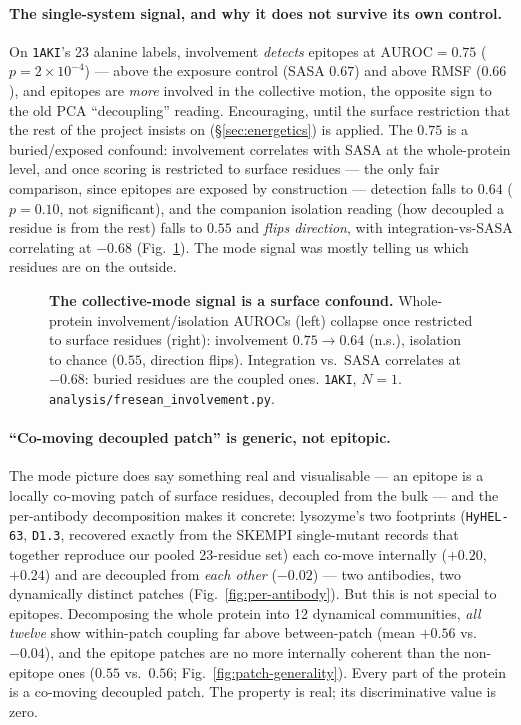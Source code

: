 \paragraph{The single-system signal, and why it does not survive its own control.} On \texttt{1AKI}'s
23 alanine labels, involvement \emph{detects} epitopes at $\mathrm{AUROC}=0.75$ ($p=2\times10^{-4}$) ---
above the exposure control (SASA $0.67$) and above RMSF ($0.66$), and epitopes are \emph{more} involved in
the collective motion, the opposite sign to the old PCA ``decoupling'' reading. Encouraging, until the
surface restriction that the rest of the project insists on (\S\ref{sec:energetics}) is applied. The
$0.75$ is a buried/exposed confound: involvement correlates with SASA at the whole-protein level, and once
scoring is restricted to surface residues --- the only fair comparison, since epitopes are exposed by
construction --- detection falls to $0.64$ ($p=0.10$, not significant), and the companion isolation reading
(how decoupled a residue is from the rest) falls to $0.55$ and \emph{flips direction}, with
integration-vs-SASA correlating at $-0.68$ (Fig.~\ref{fig:surface-isolation}). The mode signal was mostly
telling us which residues are on the outside.

\begin{figure}[H]\centering
{}
\caption{\textbf{The collective-mode signal is a surface confound.} Whole-protein involvement/isolation
AUROCs (left) collapse once restricted to surface residues (right): involvement $0.75\!\to\!0.64$ (n.s.),
isolation to chance ($0.55$, direction flips). Integration vs.\ SASA correlates at $-0.68$: buried residues
are the coupled ones. \texttt{1AKI}, $N=1$. \texttt{analysis/fresean\_involvement.py}.}
\label{fig:surface-isolation}
\end{figure}

\paragraph{``Co-moving decoupled patch'' is generic, not epitopic.} The mode picture does say something
real and visualisable --- an epitope is a locally co-moving patch of surface residues, decoupled from the
bulk --- and the per-antibody decomposition makes it concrete: lysozyme's two footprints (\texttt{HyHEL-63},
\texttt{D1.3}, recovered exactly from the SKEMPI single-mutant records that together reproduce our pooled
23-residue set) each co-move internally ($+0.20$, $+0.24$) and are decoupled from \emph{each other}
($-0.02$) --- two antibodies, two dynamically distinct patches (Fig.~\ref{fig:per-antibody}). But this is
not special to epitopes. Decomposing the whole protein into 12 dynamical communities, \emph{all twelve}
show within-patch coupling far above between-patch (mean $+0.56$ vs.\ $-0.04$), and the epitope patches are
no more internally coherent than the non-epitope ones ($0.55$ vs.\ $0.56$; Fig.~\ref{fig:patch-generality}).
Every part of the protein is a co-moving decoupled patch. The property is real; its discriminative value is
zero.

